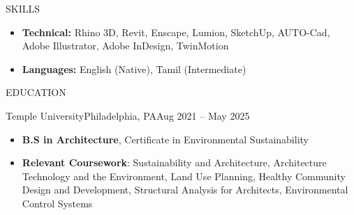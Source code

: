\documentclass[]{mcdowellcv}
\begin{document}
	\makeheader
	
	

	\begin{cvsection}{SKILLS}
		\begin{cvsubsection}{}{}{}	
			\begin{itemize}
				\item \textbf{Technical: }Rhino 3D, Revit, Enscape, Lumion, SketchUp, AUTO-Cad, Adobe Illustrator, Adobe InDesign, TwinMotion
				\item \textbf{Languages: }English (Native), Tamil (Intermediate)
			\end{itemize}
		\end{cvsubsection}
	\end{cvsection}

	\begin{cvsection}{EDUCATION}
		\begin{cvsubsection}{Temple University}{Philadelphia, PA}{Aug 2021 -- May 2025}
			\begin{itemize}
				\item \textbf{B.S in Architecture}, Certificate in Environmental Sustainability
				\item \textbf{Relevant Coursework}: Sustainability and Architecture, Architecture Technology and the Environment, Land Use Planning, Healthy Community Design and Development, Structural Analysis for Architects, Environmental Control Systems
			\end{itemize}
		\end{cvsubsection}
	\end{cvsection}
\end{document}
